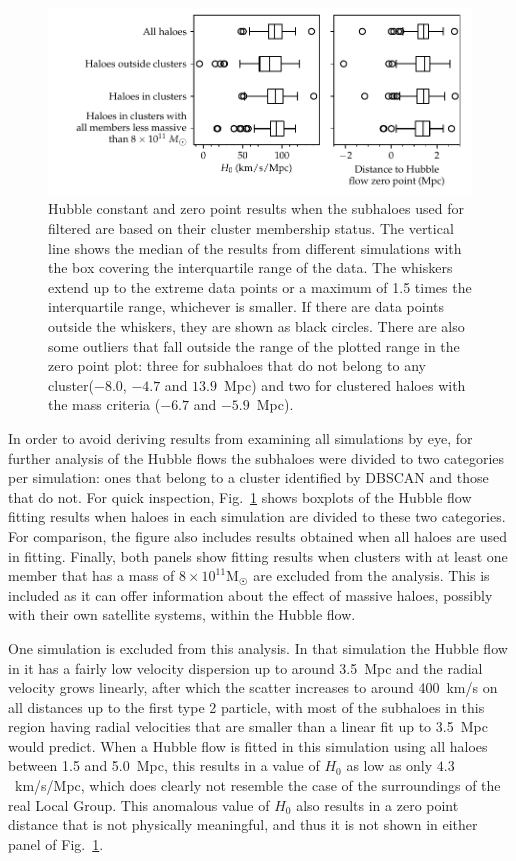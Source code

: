 \documentclass[english, oneside]{HYgradu}
\begin{document}
\begin{figure}
    \centering
    \includegraphics{kuvat/clusteredHFparameters.pdf}
    \caption{Hubble constant and zero point results when the subhaloes used for filtered are based on their cluster membership status. The vertical line shows the median of the results from different simulations with the box covering the interquartile range of the data. The whiskers extend up to the extreme data points or a maximum of 1.5 times the interquartile range, whichever is smaller. If there are data points outside the whiskers, they are shown as black circles. There are also some outliers that fall outside the range of the plotted range in the zero point plot: three for subhaloes that do not belong to any cluster($-8.0$, $-4.7$ and $13.9$~Mpc) and two for clustered haloes with the mass criteria ($-6.7$ and $-5.9$~Mpc).}\label{fig:clusteredHFparameters}
\end{figure}

In order to avoid deriving results from examining all simulations by eye, for further analysis of the Hubble flows the subhaloes were divided to two categories per simulation: ones that belong to a cluster identified by DBSCAN and those that do not. For quick inspection, Fig.~\ref{fig:clusteredHFparameters} shows boxplots of the Hubble flow fitting results when haloes in each simulation are divided to these two categories. For comparison, the figure also includes results obtained when all haloes are used in fitting. Finally, both panels show fitting results when clusters with at least one member that has a mass of $8 \times 10^{11} \mathrm{M}_{\astrosun}$ are excluded from the analysis. This is included as it can offer information about the effect of massive haloes, possibly with their own satellite systems, within the Hubble flow.

One simulation is excluded from this analysis. In that simulation the Hubble flow in it has a fairly low velocity dispersion up to around 3.5~Mpc and the radial velocity grows linearly, after which the scatter increases to around 400~km/s on all distances up to the first type 2 particle, with most of the subhaloes in this region having radial velocities that are smaller than a linear fit up to 3.5~Mpc would predict. When a Hubble flow is fitted in this simulation using all haloes between 1.5 and 5.0~Mpc, this results in a value of $H_0$ as low as only $4.3$~km/s/Mpc, which does clearly not resemble the case of the surroundings of the real Local Group. This anomalous value of $H_0$ also results in a zero point distance that is not physically meaningful, and thus it is not shown in either panel of Fig.~\ref{fig:clusteredHFparameters}.
\end{document}
